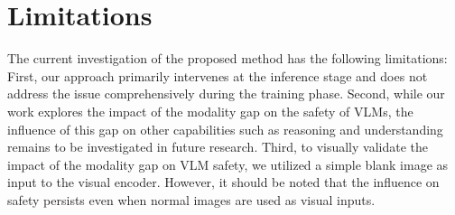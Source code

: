 \section*{Limitations}


The current investigation of the proposed method has the following limitations:
First, our approach primarily intervenes at the inference stage and does not address the issue comprehensively during the training phase.
Second, while our work explores the impact of the modality gap on the safety of VLMs, the influence of this gap on other capabilities such as reasoning and understanding remains to be investigated in future research.
Third, to visually validate the impact of the modality gap on VLM safety, we utilized a simple blank image as input to the visual encoder. However, it should be noted that the influence on safety persists even when normal images are used as visual inputs.





